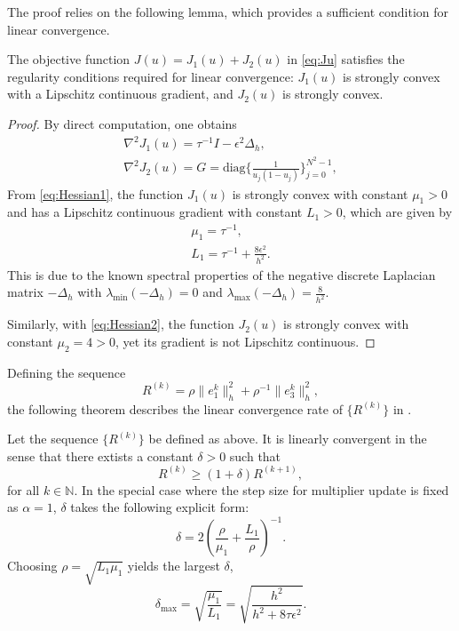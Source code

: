The proof relies on the following lemma, which provides a sufficient condition for linear convergence. 
\begin{lemma}\label{lm:J}
    The objective function $J(u)=J_1(u)+J_2(u)$ in \eqref{eq:Ju} satisfies the regularity conditions required for linear convergence: 
$J_1(u)$ is strongly convex with a Lipschitz continuous gradient, and $J_2(u)$ is strongly convex.
\end{lemma}
\begin{proof}
    By direct computation, one obtains
\begin{subequations}
\begin{align}
\label{eq:Hessian1}
\nabla^2J_1(u)=\tau^{-1}I-\epsilon^2\Delta_h,\\
\label{eq:Hessian2}
\nabla^2J_2(u)=G=\text{diag}\{\frac{1}{u_j(1-u_j)}\}_{j=0}^{N^2-1},
\end{align}
\end{subequations}
From \eqref{eq:Hessian1}, the function $J_1(u)$ is strongly convex with constant $\mu_1>0$ 
and has a Lipschitz continuous gradient with constant $L_1>0$, which are given by
\begin{align}
    \mu_1=\tau^{-1},\\
    L_1=\tau^{-1}+\frac{8\epsilon^2}{h^2}.
\end{align}
This is due to the known spectral properties of the negative discrete Laplacian matrix $-\Delta_h$ 
with $\lambda_{\min}(-\Delta_h)=0$ and $\lambda_{\max}(-\Delta_h)=\frac{8}{h^2}$.
\par Similarly, with \eqref{eq:Hessian2}, the function $J_2(u)$ is strongly convex with constant $\mu_2=4>0$, 
yet its gradient is not Lipschitz continuous.
\end{proof}
Defining the sequence 
\begin{equation}
R^{(k)}=\rho \|e_1^{k}\|_h^2+\rho^{-1}\|e_3^{k}\|_h^2, 
\end{equation}
the following theorem describes the linear convergence rate of $\{R^{(k)}\}$ in .
\begin{theorem}
Let the sequence $\{R^{(k)}\}$ be defined as above. It is linearly convergent in the sense that there extists a constant $\delta>0$ such that 
\begin{equation}
    R^{(k)}\geq (1+\delta) R^{(k+1)},
\end{equation}
for all $k\in \mathbb{N}$. In the special case where the step size for multiplier update is fixed as $\alpha=1$, $\delta$ takes the following explicit form:
\begin{equation}
\delta=2(\frac{\rho}{\mu_1}+\frac{L_1}{\rho})^{-1}.
\end{equation}
Choosing $\rho=\sqrt{L_1\mu_1}$ yields the largest $\delta$,
\begin{equation}
\delta_{\max}=\sqrt{\frac{\mu_1}{L_1}}=\sqrt{\frac{h^2}{h^2+8\tau \epsilon^2}}.
\end{equation}
\end{theorem}
